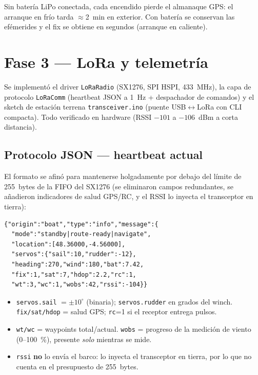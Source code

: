 \documentclass[12pt,a4paper]{article}
\newcommand{\file}[1]{\texttt{#1}}
\begin{document}
Sin bater\'ia LiPo conectada, cada encendido pierde el almanaque GPS: el arranque
en fr\'io tarda $\approx$2~min en exterior. Con bater\'ia se conservan las
ef\'emerides y el fix se obtiene en segundos (arranque en caliente).

\section{Fase 3 --- LoRa y telemetr\'ia}

Se implement\'o el driver \file{LoRaRadio} (SX1276, SPI HSPI, 433~MHz), la capa de
protocolo \file{LoRaComm} (heartbeat JSON a 1~Hz + despachador de comandos) y el
sketch de estaci\'on terrena \file{transceiver.ino} (puente USB$\leftrightarrow$LoRa
con CLI compacta). Todo verificado en hardware (RSSI $-101$ a $-106$~dBm a corta
distancia).

\subsection{Protocolo JSON --- heartbeat actual}

El formato se afin\'o para mantenerse holgadamente por debajo del l\'imite de
255~bytes de la FIFO del SX1276 (se eliminaron campos redundantes, se a\~nadieron
indicadores de salud GPS/RC, y el RSSI lo inyecta el transceptor en tierra):

\begin{lstlisting}[style=json, caption={Heartbeat dron -> tierra (1 Hz)}]
{"origin":"boat","type":"info","message":{
  "mode":"standby|route-ready|navigate",
  "location":[48.36000,-4.56000],
  "servos":{"sail":10,"rudder":-12},
  "heading":270,"wind":180,"bat":7.42,
  "fix":1,"sat":7,"hdop":2.2,"rc":1,
  "wt":3,"wc":1,"wobs":42,"rssi":-104}}
\end{lstlisting}

\begin{itemize}
  \item \texttt{servos.sail} $=\pm10^{\circ}$ (binaria); \texttt{servos.rudder} en
    grados del winch. \texttt{fix/sat/hdop} = salud GPS; \texttt{rc}=1 si el
    receptor entrega pulsos.
  \item \texttt{wt/wc} = waypoints total/actual. \texttt{wobs} = progreso de la
    medici\'on de viento (0--100~\%), presente \emph{solo} mientras se mide.
  \item \texttt{rssi} \textbf{no} lo env\'ia el barco: lo inyecta el transceptor en
    tierra, por lo que no cuenta en el presupuesto de 255~bytes.
\end{itemize}
\end{document}
